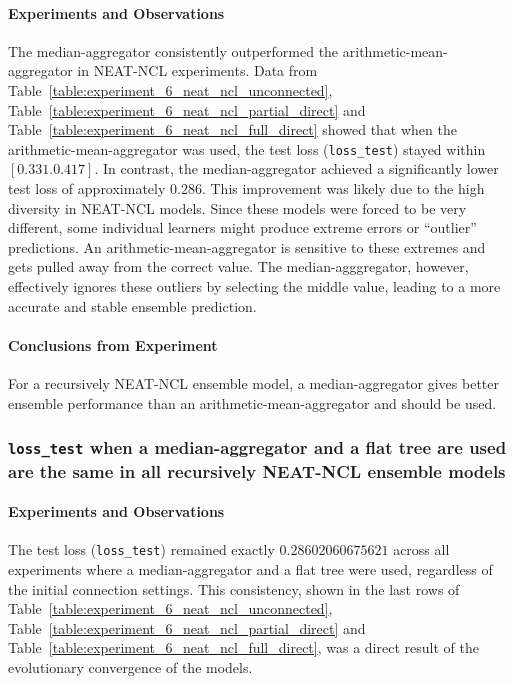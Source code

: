 \documentclass{article}
\begin{document}
\paragraph{Experiments and Observations}
The median-aggregator consistently outperformed the arithmetic-mean-aggregator in NEAT-NCL experiments. Data from Table~\ref{table:experiment_6_neat_ncl_unconnected}, Table~\ref{table:experiment_6_neat_ncl_partial_direct} and Table~\ref{table:experiment_6_neat_ncl_full_direct} showed that when the arithmetic-mean-aggregator was used, the test loss (\texttt{loss\_test}) stayed within $[0.331. 0.417]$. In contrast, the median-aggregator achieved a significantly lower test loss of approximately $0.286$. This improvement was likely due to the high diversity in NEAT-NCL models. Since these models were forced to be very different, some individual learners might produce extreme errors or ``outlier'' predictions. An arithmetic-mean-aggregator is sensitive to these extremes and gets pulled away from the correct value. The median-agggregator, however, effectively ignores these outliers by selecting the middle value, leading to a more accurate and stable ensemble prediction. 

\paragraph{Conclusions from Experiment}
For a recursively NEAT-NCL ensemble model, a median-aggregator gives better ensemble performance than an arithmetic-mean-aggregator and should be used. 


\subsubsection{\texttt{loss\_test} when a median-aggregator and a flat tree are used are the same in all recursively NEAT-NCL ensemble models}
\paragraph{Experiments and Observations}
The test loss (\texttt{loss\_test}) remained exactly $0.28602060675621$ across all experiments where a median-aggregator and a flat tree were used, regardless of the initial connection settings. This consistency, shown in the last rows of Table~\ref{table:experiment_6_neat_ncl_unconnected}, Table~\ref{table:experiment_6_neat_ncl_partial_direct} and Table~\ref{table:experiment_6_neat_ncl_full_direct}, was a direct result of the evolutionary convergence of the models. 
\end{document}

